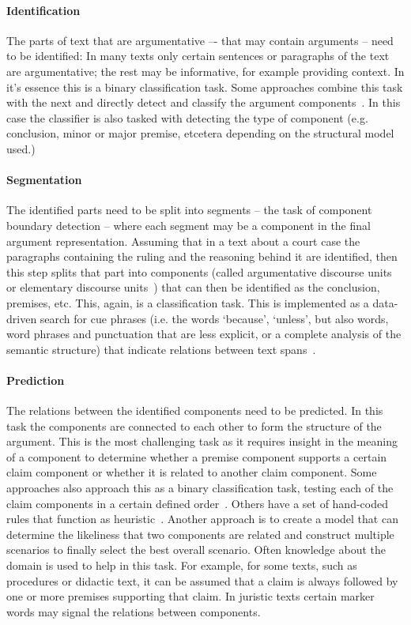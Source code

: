 \documentclass{IOS-Book-Article}
\begin{document}
\paragraph{Identification} The parts of text that are argumentative –- that may contain arguments -- need to be identified: In many texts only certain sentences or paragraphs of the text are argumentative; the rest may be informative, for example providing context. In it's essence this is a binary classification task. Some approaches combine this task with the next and directly detect and classify the argument components~\cite{stabGurevych2017}. In this case the classifier is also tasked with detecting the type of component (e.g. conclusion, minor or major premise, etcetera depending on the structural model used.)

\paragraph{Segmentation} The identified parts need to be split into segments -- the task of component boundary detection -- where each segment may be a component in the final argument representation. Assuming that in a text about a court case the paragraphs containing the ruling and the reasoning behind it are identified, then this step splits that part into components (called argumentative discourse units~\cite{cohen1987} or elementary discourse units~\cite{saintDizier2012}) that can then be identified as the conclusion, premises, etc. This, again, is a classification task. This is implemented as a data-driven search for cue phrases (i.e. the words `because', `unless', but also words, word phrases and punctuation that are less explicit, or a complete analysis of the semantic structure) that indicate relations between text spans~\cite{mochales2011argumentation,saintDizier2012,lawrenceReed2015,stabGurevych2017}.

\paragraph{Prediction} The relations between the identified components need to be predicted. In this task the components are connected to each other to form the structure of the argument. This is the most challenging task as it requires insight in the meaning of a component to determine whether a premise component supports a certain claim component or whether it is related to another claim component. Some approaches also approach this as a binary classification task, testing each of the claim components in a certain defined order~\cite{cohen1987}. Others have a set of hand-coded rules that function as heuristic~\cite{saintDizier2012}. Another approach is to create a model that can determine the likeliness that two components are related and construct multiple scenarios to finally select the best overall scenario. Often knowledge about the domain is used to help in this task. For example, for some texts, such as procedures or didactic text, it can be assumed that a claim is always followed by one or more premises supporting that claim. In juristic texts certain marker words may signal the relations between components.
\end{document}
